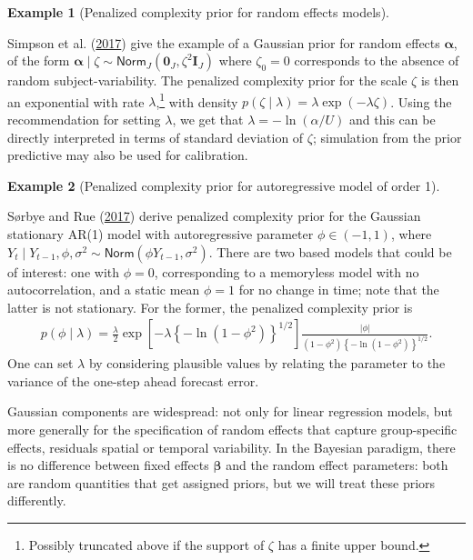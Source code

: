\documentclass[
  11pt,
  letterpaper,
]{scrbook}
\theoremstyle{definition}
\newtheorem{example}{Example}[chapter]
\theoremstyle{definition}
\theoremstyle{definition}
\theoremstyle{plain}
\theoremstyle{remark}
\begin{document}
\begin{example}[Penalized complexity prior for random effects
models]\protect\hypertarget{exm-pcprior-randomeffect}{}\label{exm-pcprior-randomeffect}

Simpson et al. (\protect\hyperlink{ref-Simpson:2017}{2017}) give the
example of a Gaussian prior for random effects \(\boldsymbol{\alpha}\),
of the form
\(\boldsymbol{\alpha} \mid \zeta \sim \mathsf{Norm}_J(\boldsymbol{0}_J, \zeta^2 \mathbf{I}_J)\)
where \(\zeta_0=0\) corresponds to the absence of random
subject-variability. The penalized complexity prior for the scale
\(\zeta\) is then an exponential with rate \(\lambda\),\footnote{Possibly
  truncated above if the support of \(\zeta\) has a finite upper bound.}
with density \(p(\zeta \mid \lambda) = \lambda \exp(-\lambda \zeta)\).
Using the recommendation for setting \(\lambda\), we get that
\(\lambda = -\ln(\alpha/U)\) and this can be directly interpreted in
terms of standard deviation of \(\zeta\); simulation from the prior
predictive may also be used for calibration.

\end{example}

\begin{example}[Penalized complexity prior for autoregressive model of
order
1]\protect\hypertarget{exm-pcprior-arorder}{}\label{exm-pcprior-arorder}

Sørbye and Rue (\protect\hyperlink{ref-Sorbye.Rue:2017}{2017}) derive
penalized complexity prior for the Gaussian stationary AR(1) model with
autoregressive parameter \(\phi \in (-1,1)\), where
\(Y_t \mid Y_{t-1}, \phi, \sigma^2 \sim \mathsf{Norm}(\phi Y_{t-1}, \sigma^2)\).
There are two based models that could be of interest: one with
\(\phi=0\), corresponding to a memoryless model with no autocorrelation,
and a static mean \(\phi=1\) for no change in time; note that the latter
is not stationary. For the former, the penalized complexity prior is
\begin{align*}
p(\phi \mid \lambda) = \frac{\lambda}{2} \exp\left[-\lambda \left\{-\ln(1-\phi^2)\right\}^{1/2}\right] \frac{|\phi|}{(1-\phi^2)\left\{-\ln(1-\phi^2)\right\}^{1/2}}.
\end{align*} One can set \(\lambda\) by considering plausible values by
relating the parameter to the variance of the one-step ahead forecast
error.

\end{example}

Gaussian components are widespread: not only for linear regression
models, but more generally for the specification of random effects that
capture group-specific effects, residuals spatial or temporal
variability. In the Bayesian paradigm, there is no difference between
fixed effects \(\boldsymbol{\beta}\) and the random effect parameters:
both are random quantities that get assigned priors, but we will treat
these priors differently.
\end{document}
